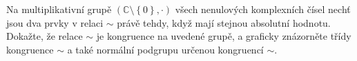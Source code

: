 Na multiplikativní grupě $(\mathbb{C} \setminus \left \{ 0 \right \} ,\cdot )$
všech nenulových komplexních čísel nechť jsou dva prvky v relaci $\sim$ právě
tehdy, když mají stejnou absolutní hodnotu. Dokažte, že relace $\sim$ je
kongruence na uvedené grupě, a graficky znázorněte třídy kongruence $\sim$ a
také normální podgrupu určenou kongruencí $\sim$.
